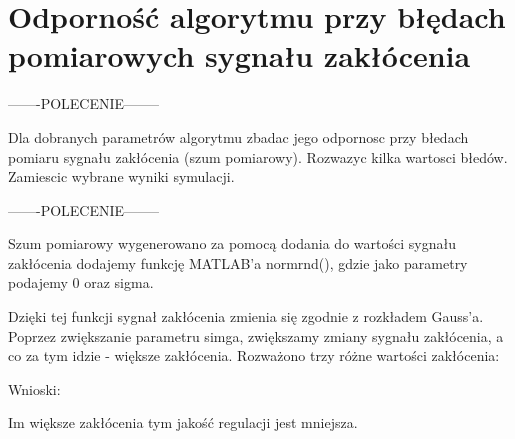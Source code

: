 \section{Odporność algorytmu przy błędach pomiarowych sygnału zakłócenia}
\label{projekt:zad7}

-------POLECENIE--------

Dla dobranych parametrów algorytmu zbadac jego odpornosc przy błedach pomiaru
sygnału zakłócenia (szum pomiarowy). Rozwazyc kilka wartosci błedów. Zamiescic
wybrane wyniki symulacji.

-------POLECENIE--------

Szum pomiarowy wygenerowano za pomocą dodania do wartości sygnału zakłócenia
dodajemy funkcję MATLAB’a normrnd(), 
gdzie jako parametry podajemy 0 oraz sigma.

Dzięki tej funkcji sygnał zakłócenia zmienia się zgodnie z rozkładem Gauss’a.
Poprzez zwiększanie parametru simga, zwiększamy zmiany sygnału zakłócenia, 
a co za tym idzie - większe zakłócenia. 
Rozważono trzy różne wartości zakłócenia:

Wnioski: 

Im większe zakłócenia tym jakość regulacji jest mniejsza.
